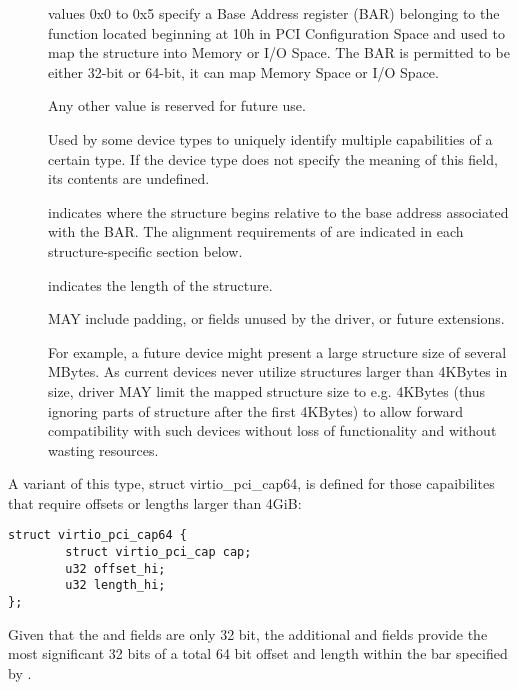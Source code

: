 \begin{description}
\item[]
        values 0x0 to 0x5 specify a Base Address register (BAR) belonging to
        the function located beginning at 10h in PCI Configuration Space
        and used to map the structure into Memory or I/O Space.
        The BAR is permitted to be either 32-bit or 64-bit, it can map Memory Space
        or I/O Space.

        Any other value is reserved for future use.

\item[]
        Used by some device types to uniquely identify multiple capabilities
        of a certain type. If the device type does not specify the meaning of
        this field, its contents are undefined.


\item[]
        indicates where the structure begins relative to the base address associated
        with the BAR.  The alignment requirements of  are indicated
        in each structure-specific section below.

\item[]
        indicates the length of the structure.

         MAY include padding, or fields unused by the driver, or
        future extensions.

        \begin{note}
        For example, a future device might present a large structure size of several
        MBytes.
        As current devices never utilize structures larger than 4KBytes in size,
        driver MAY limit the mapped structure size to e.g.
        4KBytes (thus ignoring parts of structure after the first
        4KBytes) to allow forward compatibility with such devices without loss of
        functionality and without wasting resources.
        \end{note}
\end{description}

A variant of this type, struct virtio_pci_cap64, is defined for
those capaibilites that require offsets or lengths larger than
4GiB:

\begin{lstlisting}
struct virtio_pci_cap64 {
        struct virtio_pci_cap cap;
        u32 offset_hi;
        u32 length_hi;
};
\end{lstlisting}

Given that the  and  fields
are only 32 bit, the additional  and 
fields provide the most significant 32 bits of a total 64 bit offset and
length within the bar specified by .

